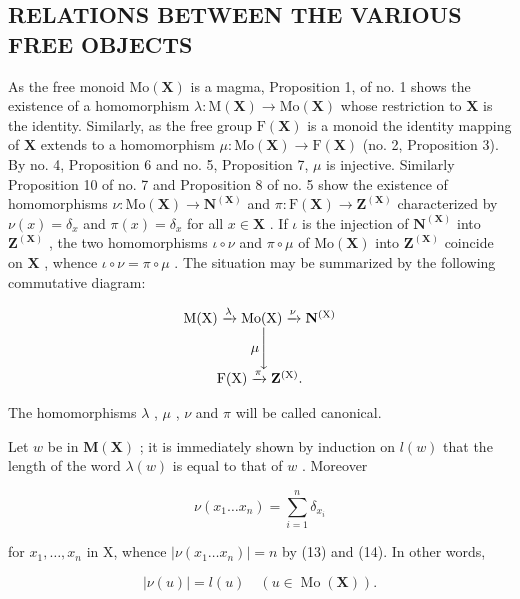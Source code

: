 \subsection{RELATIONS BETWEEN THE VARIOUS FREE OBJECTS}

As the free monoid \(\mathrm{Mo}(\mathbf{X})\) is a magma, Proposition 1, of no. 1 shows the existence of a homomorphism \(\lambda: \mathrm{M}(\mathbf{X}) \to \mathrm{Mo}(\mathbf{X})\) whose restriction to \(\mathbf{X}\) is the identity. Similarly, as the free group \(\mathrm{F}(\mathbf{X})\) is a monoid the identity mapping of \(\mathbf{X}\) extends to a homomorphism \(\mu: \mathrm{Mo}(\mathbf{X}) \to \mathrm{F}(\mathbf{X})\) (no. 2, Proposition 3). By no. 4, Proposition 6 and no. 5, Proposition 7, \(\mu\) is injective. Similarly Proposition 10 of no. 7 and Proposition 8 of no. 5 show the existence of homomorphisms \(\nu: \mathrm{Mo}(\mathbf{X}) \to \mathbf{N}^{(\mathbf{X})}\) and \(\pi: \mathrm{F}(\mathbf{X}) \to \mathbf{Z}^{(\mathbf{X})}\) characterized by \(\nu(x) = \delta_x\) and \(\pi(x) = \delta_x\) for all \(x \in \mathbf{X}\) . If \(\iota\) is the injection of \(\mathbf{N}^{(\mathbf{X})}\) into \(\mathbf{Z}^{(\mathbf{X})}\) , the two homomorphisms \(\iota \circ \nu\) and \(\pi \circ \mu\) of \(\mathrm{Mo}(\mathbf{X})\) into \(\mathbf{Z}^{(\mathbf{X})}\) coincide on \(\mathbf{X}\) , whence \(\iota \circ \nu = \pi \circ \mu\) . The situation may be summarized by the following commutative diagram:

\[
\begin{array}{c} \mathrm{M} (\mathrm{X}) \xrightarrow {\lambda} \mathrm{Mo} (\mathrm{X}) \xrightarrow {\nu} \mathbf {N} ^ {(\mathrm{X})} \\ \mu \Biggl \downarrow \\ \mathrm{F} (\mathrm{X}) \xrightarrow {\pi} \mathbf {Z} ^ {(\mathrm{X})}. \end{array}
\]

The homomorphisms \(\lambda\) , \(\mu\) , \(\nu\) and \(\pi\) will be called canonical.

Let \(w\) be in \(\mathbf{M}(\mathbf{X})\) ; it is immediately shown by induction on \(l(w)\) that the length of the word \(\lambda(w)\) is equal to that of \(w\) . Moreover

\[
\nu (x _ {1} \dots x _ {n}) = \sum_ {i = 1} ^ {n} \delta_ {x _ {i}}\tag{21}
\]

for \(x_1, \ldots, x_n\) in X, whence \(|\nu(x_1 \ldots x_n)| = n\) by (13) and (14). In other words,

\[
\left| \nu (u) \right| = l (u) \quad (u \in \operatorname{Mo} (\mathbf {X})).\tag{22}
\]


